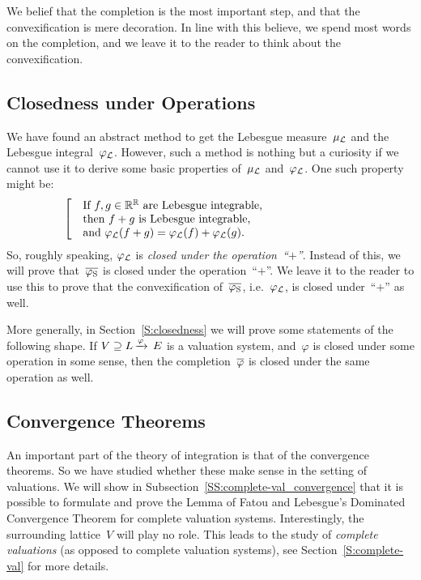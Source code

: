 We belief that
the completion is the most important step,
and that the convexification
is mere decoration.
In line with this believe,
we spend most words
on the completion,
and we leave it to the reader
to think about the convexification.


\subsection{Closedness under Operations}
We have found an abstract method
to get the Lebesgue measure~$\mu_{\mathcal{L}}$ and
the Lebesgue integral~$\varphi_{\mathcal{L}}$.
However, such a method is nothing but a curiosity
if we cannot use it to derive some
basic properties of~$\mu_{\mathcal{L}}$ and~$\varphi_{\mathcal{L}}$.
One such property might be:
\begin{equation*}
\left[\quad
\begin{minipage}{.7\columnwidth}
If $f,g\in \R^\R$
are Lebesgue integrable,\\
then $f+g$ is Lebesgue integrable,\\
and $\Lphi(f+g) = \Lphi(f)+\Lphi(g)$.
\end{minipage}
\right.
\end{equation*}
So, roughly speaking,
$\varphi_{\mathcal{L}}$ is \emph{closed under the operation~``$+$''}.
Instead of this,
we will prove that~$\overline{\varphi_{\mathrm{S}}}$ is closed under the operation~``$+$''.
We leave it to the reader to use this to prove that the convexification
 of~$\overline{\varphi_{\mathrm{S}}}$, i.e.~$\varphi_{\mathcal{L}}$, is closed under~``$+$'' as well.

More generally,
in Section~\ref{S:closedness}
we will prove some  statements of the following shape.
If $V \supseteq L\,\smash{\xrightarrow{\varphi}\,E}$
is a valuation system,
and~$\varphi$ is closed under some operation in some sense,
then the completion~$\overline{\varphi}$ is closed under the same operation as well.


\subsection{Convergence Theorems}
An important part of the theory of integration
is that of the convergence theorems.
So we have studied whether
these make sense in the setting of valuations.
We will show in Subsection~\ref{SS:complete-val_convergence}
that it is possible to formulate
and prove
the Lemma of Fatou
and Lebesgue's Dominated Convergence Theorem
for complete valuation systems.
Interestingly,
the surrounding lattice~$V$ will play no role.
This leads to the study 
of \emph{complete valuations}
(as opposed to complete valuation systems),
see Section~\ref{S:complete-val} for more details.


